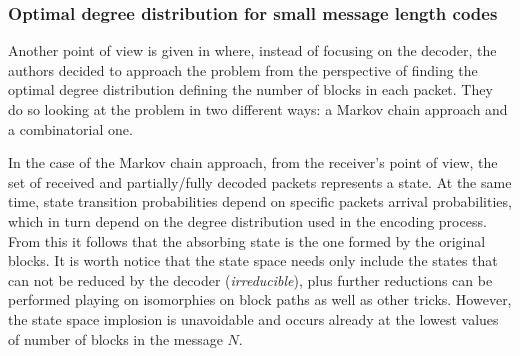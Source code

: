 \subsubsection{Optimal degree distribution for small message length codes}
Another point of view is given in \cite{Hyytia2007} where, instead of focusing on the decoder, the authors decided to approach the problem from the perspective of finding the optimal degree distribution defining the number of blocks in each packet. They do so looking at the problem in two different ways: a Markov chain approach and a combinatorial one.

In the case of the Markov chain approach, from the receiver's point of view, the set of received and partially/fully decoded packets represents a state. At the same time, state transition probabilities depend on specific packets arrival probabilities, which in turn depend on the degree distribution used in the encoding process. From this it follows that the absorbing state is the one formed by the original blocks. It is worth notice that the state space needs only include the states that can not be reduced by the decoder (\textit{irreducible}), plus further reductions can be performed playing on isomorphies on block paths as well as other tricks. However, the state space implosion is unavoidable and occurs already at the lowest values of number of blocks in the message $N$.\cite{Hyytia2007}

